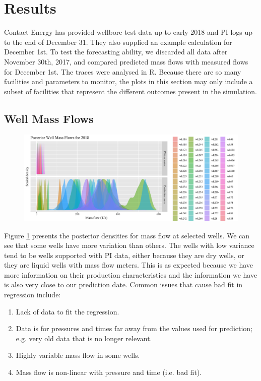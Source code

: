 \documentclass[a4paper, 12pt]{article}
\begin{document}
\section{Results}
Contact Energy has provided wellbore test data up to early 2018 and PI logs up to the end of December 31. They also supplied an example calculation for December 1st. To test the forecasting ability, we discarded all data after November 30th, 2017, and compared predicted mass flows with measured flows for December 1st. The traces were analysed in R. Because there are so many facilities and parameters to monitor, the plots in this section may only include a subset of facilities that represent the different outcomes present in the simulation.

\subsection{Well Mass Flows}
\begin{figure}
\centering
  \includegraphics[width=\linewidth]{media/mf_wells}
  \label{fig:mf_wells}
\end{figure}

Figure \ref{fig:mf_wells} presents the posterior densities for mass flow at selected wells. We can see that some wells have more variation than others. The wells with low variance tend to be wells supported with PI data, either because they are dry wells, or they are liquid wells with mass flow meters. This is as expected because we have more information on their production characteristics and the information we have is also very close to our prediction date. Common issues that cause bad fit in regression include:

\begin{enumerate}
\item Lack of data to fit the regression.
\item Data is for pressures and times far away from the values used for prediction; e.g. very old data that is no longer relevant.
\item Highly variable mass flow in some wells.
\item Mass flow is non-linear with pressure and time (i.e. bad fit).
\end{enumerate}
\end{document}
